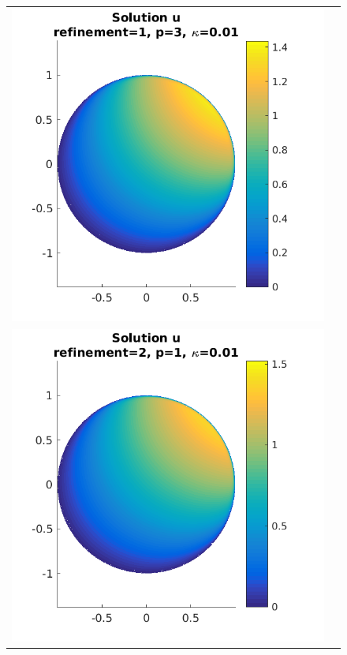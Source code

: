 \documentclass{article}
\begin{document}
\begin{figure}[!ht]
\begin{tabular}{c c}
\includegraphics[scale=0.7]{umu_223.png} \\
\includegraphics[scale=0.7]{umu_133.png} & 

\end{tabular}
\end{figure}
\end{document}
